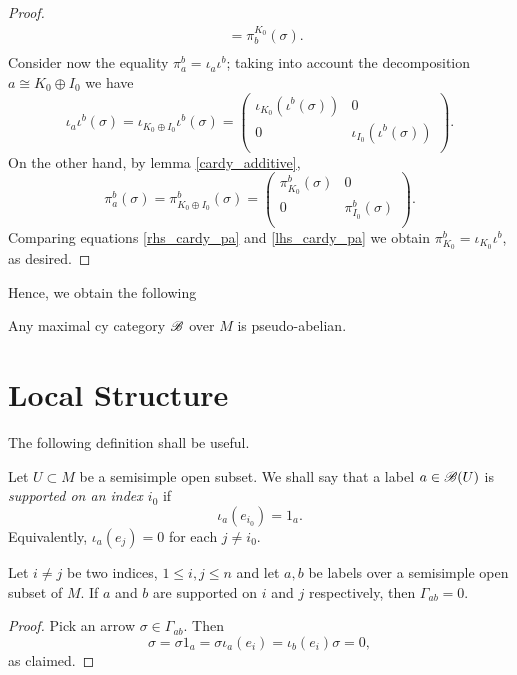 \begin{proof}
$$\begin{aligned}
														&= \pi_b^{K_0}(\sigma ). \\
\end{aligned}
$$
Consider now the equality $\pi^b_a=\iota_a\iota^b$; taking into account the decomposition $a\cong K_0\oplus I_0$ we have
\begin{equation}\label{rhs_cardy_pa}
\iota_a\iota^b(\sigma ) = \iota_{K_0\oplus I_0}\iota^b(\sigma ) = \left (\begin{smallmatrix} \iota_{K_0}\left (\iota^b(\sigma )\right ) & 0 \\ 0 & \iota_{I_0}\left (\iota^b(\sigma )\right ) \\ \end{smallmatrix} \right ).
\end{equation}
On the other hand, by lemma \ref{cardy_additive},
\begin{equation}\label{lhs_cardy_pa}
\pi^b_a(\sigma )= \pi^b_{K_0\oplus I_0} (\sigma )=\left (\begin{smallmatrix} \pi^b_{K_0}(\sigma ) & 0 \\ 0 & \pi^b_{I_0}(\sigma ) \\ \end{smallmatrix} \right ).
\end{equation}
Comparing equations \eqref{rhs_cardy_pa} and \eqref{lhs_cardy_pa} we obtain $\pi^b_{K_0}=\iota_{K_0}\iota^b$, as desired.
\end{proof}

Hence, we obtain the following

\begin{cor}
Any maximal {\sc cy} category $\mathscr{B}$ over $M$ is pseudo-abelian.
\end{cor}



\section{Local Structure}
\label{ss_local_structure}

The following definition shall be useful.

\begin{defi}
Let $U\subset M$ be a semisimple open subset. We shall say that a label $a\in \mathscr{B}(U)$ is \emph{supported on an index $i_0$} if
$$\iota_{a}(e_{i_0})=1_a.$$
Equivalently, $\iota_a(e_j)=0$ for each $j\neq i_0$. 
\end{defi}

\begin{lemma}\label{support_ij}
Let $i\neq j$ be two indices, $1\leqslant i,j\leqslant n$ and let $a,b$ be labels over a semisimple open subset of $M$. If $a$ and $b$ are supported on $i$ and $j$ respectively, then $\Gamma_{ab}=0$.
\end{lemma}
\begin{proof}
Pick an arrow $\sigma \in \Gamma_{ab}$. Then
$$\sigma =\sigma 1_a=\sigma \iota_a(e_i)=\iota_b(e_i)\sigma =0,$$
as claimed.
\end{proof}

